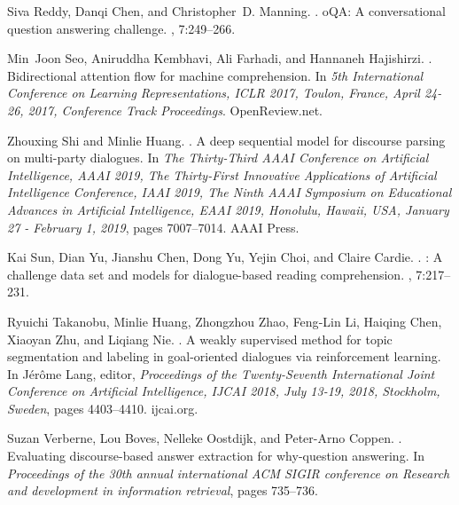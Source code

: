 \documentclass[11pt]{article}
\begin{document}
\begin{thebibliography}{}
Siva Reddy, Danqi Chen, and Christopher~D. Manning.
.
o{QA}: A conversational question answering challenge.
,
  7:249--266.

Min~Joon Seo, Aniruddha Kembhavi, Ali Farhadi, and Hannaneh Hajishirzi.
.
\newblock Bidirectional attention flow for machine comprehension.
\newblock In {\em 5th International Conference on Learning Representations,
  {ICLR} 2017, Toulon, France, April 24-26, 2017, Conference Track
  Proceedings}. OpenReview.net.

Zhouxing Shi and Minlie Huang.
.
\newblock A deep sequential model for discourse parsing on multi-party
  dialogues.
\newblock In {\em The Thirty-Third {AAAI} Conference on Artificial
  Intelligence, {AAAI} 2019, The Thirty-First Innovative Applications of
  Artificial Intelligence Conference, {IAAI} 2019, The Ninth {AAAI} Symposium
  on Educational Advances in Artificial Intelligence, {EAAI} 2019, Honolulu,
  Hawaii, USA, January 27 - February 1, 2019}, pages 7007--7014. {AAAI} Press.

Kai Sun, Dian Yu, Jianshu Chen, Dong Yu, Yejin Choi, and Claire Cardie.
.
: A challenge data set and models for dialogue-based reading
  comprehension.
,
  7:217--231.

Ryuichi Takanobu, Minlie Huang, Zhongzhou Zhao, Feng{-}Lin Li, Haiqing Chen,
  Xiaoyan Zhu, and Liqiang Nie.
.
\newblock A weakly supervised method for topic segmentation and labeling in
  goal-oriented dialogues via reinforcement learning.
\newblock In J{\'{e}}r{\^{o}}me Lang, editor, {\em Proceedings of the
  Twenty-Seventh International Joint Conference on Artificial Intelligence,
  {IJCAI} 2018, July 13-19, 2018, Stockholm, Sweden}, pages 4403--4410.
  ijcai.org.

Suzan Verberne, Lou Boves, Nelleke Oostdijk, and Peter-Arno Coppen.
.
\newblock Evaluating discourse-based answer extraction for why-question
  answering.
\newblock In {\em Proceedings of the 30th annual international ACM SIGIR
  conference on Research and development in information retrieval}, pages
  735--736.


\end{thebibliography}
\end{document}
